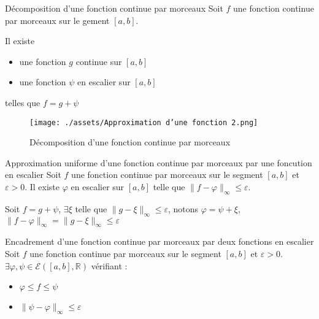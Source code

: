 \begin{Lenma}{Décomposition d'une fonction continue par morceaux}{}
  Soit $f$ une fonction continue par morceaux sur le gement $[a,b]$. 

Il existe 
\begin{itemize}

  \item une fonction $g$ continue sur $[a,b]$ 
  \item une fonction $\psi$ en escalier sur $[a,b]$

\end{itemize}
telles que $f = g + \psi$
  \begin{figure}[H] %
    \centering
    \texttt{[image: ./assets/Approximation d'une fonction 2.png]}
    \caption{Décomposition d'une fonction continue par morceaux}
  \end{figure}
\end{Lenma}


\begin{Corollary}{Approximation uniforme d'une fonction continue par morceaux par une foncution en escalier}{}
  Soit $f$ une fonction continue par morceaux sur le segment $[a,b]$ et $\varepsilon>0$. Il existe $\varphi$ en escalier sur $[a,b]$ telle que $\| f-\varphi \| _{\infty} \le \varepsilon$.
\end{Corollary}
\begin{myproof}{}{}
Soit $f  = g + \psi$, $\exists \xi$ telle que $\| g - \xi \| _{\infty} \le \varepsilon$, notons $\varphi = \psi + \xi$, $\| f - \varphi \| _{\infty} = \| g - \xi \| _{\infty} \le \varepsilon$
\end{myproof}

\begin{Corollary}{Encadrement d'une fonction continue par morceaux par deux fonctions en escalier}{}
  Soit $f$ une fonction continue par morceaux sur le segment $[a,b]$ et $\varepsilon>0$. $\exists \varphi, \psi \in \mathcal{E}([a,b], \mathbb{R})$ vérifiant :
  \begin{itemize}

      \item $\varphi \le f \le \psi$ 
      \item $\| \psi - \varphi \| _{ \infty} \le \varepsilon$

  \end{itemize}
\end{Corollary}





